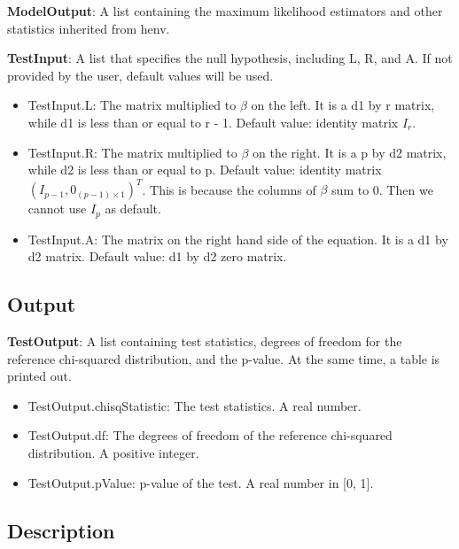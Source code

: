 \documentclass[a4paper,11pt,openany]{memoir}
\begin{document}
\begin{par}
\textbf{ModelOutput}: A list containing the maximum likelihood estimators and other statistics inherited from henv.
\end{par} \vspace{1em}
\begin{par}
\textbf{TestInput}: A list that specifies the null hypothesis, including L, R, and A.  If not provided by the user, default values will be used.
\end{par} \vspace{1em}
\begin{itemize}
\setlength{\itemsep}{-1ex}
   \item TestInput.L: The matrix multiplied to $\beta$ on the left.  It is a d1 by r matrix, while d1 is less than or equal to r - 1.  Default value: identity matrix $I_{r}$.
   \item TestInput.R: The matrix multiplied to $\beta$ on the right.  It is a p by d2 matrix, while d2 is less than or equal to p.  Default value: identity matrix $(I_{p-1}, 0_{(p-1)\times 1})^{T}$.  This is because the columns of $\beta$ sum to 0.  Then we cannot use $I_p$ as default.
   \item TestInput.A: The matrix on the right hand side of the equation.  It is a d1 by d2 matrix.  Default value: d1 by d2 zero matrix.
\end{itemize}


\subsection*{Output}

\begin{par}
\textbf{TestOutput}: A list containing test statistics, degrees of freedom for the reference chi-squared distribution, and the p-value.  At the same time, a table is printed out.
\end{par} \vspace{1em}
\begin{itemize}
\setlength{\itemsep}{-1ex}
   \item TestOutput.chisqStatistic: The test statistics. A real number.
   \item TestOutput.df: The degrees of freedom of the reference chi-squared distribution.  A positive integer.
   \item TestOutput.pValue: p-value of the test.  A real number in [0, 1].
\end{itemize}


\subsection*{Description}
\end{document}

